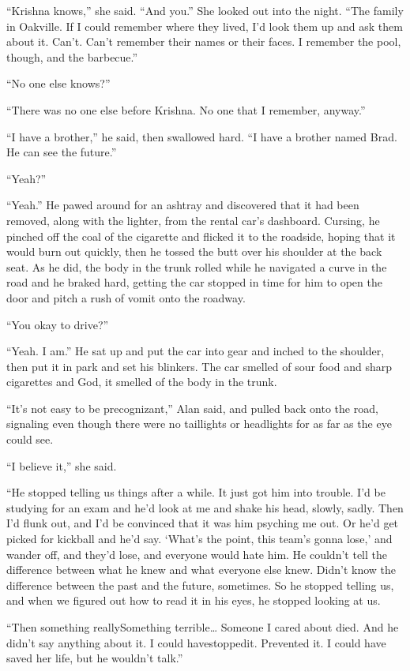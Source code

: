 ``Krishna knows,'' she said.  ``And you.'' She looked out into the
night.  ``The family in Oakville.  If I could remember where they
lived, I'd look them up and ask them about it.  Can't.  Can't remember
their names or their faces.  I remember the pool, though, and the
barbecue.''

``No one else knows?''

``There was no one else before Krishna.  No one that I remember,
anyway.''

``I have a brother,'' he said, then swallowed hard.  ``I have a
brother named Brad.  He can see the future.''

``Yeah?''

``Yeah.'' He pawed around for an ashtray and discovered that it had
been removed, along with the lighter, from the rental car's dashboard. 
Cursing, he pinched off the coal of the cigarette and flicked it to
the roadside, hoping that it would burn out quickly, then he tossed
the butt over his shoulder at the back seat.  As he did, the body in
the trunk rolled while he navigated a curve in the road and he braked
hard, getting the car stopped in time for him to open the door and
pitch a rush of vomit onto the roadway.

``You okay to drive?''

``Yeah.  I am.'' He sat up and put the car into gear and inched to the
shoulder, then put it in park and set his blinkers.  The car smelled
of sour food and sharp cigarettes and God, it smelled of the body in
the trunk.

``It's not easy to be precognizant,'' Alan said, and pulled back onto
the road, signaling even though there were no taillights or headlights
for as far as the eye could see.

``I believe it,'' she said.

``He stopped telling us things after a while.  It just got him into
trouble.  I'd be studying for an exam and he'd look at me and shake
his head, slowly, sadly.  Then I'd flunk out, and I'd be convinced
that it was him psyching me out.  Or he'd get picked for kickball and
he'd say.  `What's the point, this team's gonna lose,' and wander off,
and they'd lose, and everyone would hate him.  He couldn't tell the
difference between what he knew and what everyone else knew.  Didn't
know the difference between the past and the future, sometimes.  So he
stopped telling us, and when we figured out how to read it in his
eyes, he stopped looking at us.

``Then something really\dash{}Something terrible\ldots{}  Someone I cared about
died.  And he didn't say anything about it.  I could
have\dash{}stopped\dash{}it.  Prevented it.  I could have saved her life, but
he wouldn't talk.''

